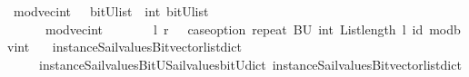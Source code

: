 \begin{isabellebody}
\isanewline
\isanewline
%
\isanewline
%
\isanewline
%
\isanewline
%
\isanewline
{}\isamarkupfalse%
\ mod{\isacharunderscore}vec{\isacharunderscore}int\ \ {\isacharcolon}{\isacharcolon}\ {\isachardoublequoteopen}{\isacharparenleft}bitU{\isacharparenright}list\ {\isasymRightarrow}\ int\ {\isasymRightarrow}{\isacharparenleft}bitU{\isacharparenright}list\ {\isachardoublequoteclose}\ \ \ \isanewline
\ \ \ \ \ {\isachardoublequoteopen}\ mod{\isacharunderscore}vec{\isacharunderscore}int\ \ \ \ \ \ \ \ l\ r\ {\isacharequal}\ {\isacharparenleft}\ case{\isacharunderscore}option\ {\isacharparenleft}repeat\ {\isacharbrackleft}BU{\isacharbrackright}\ {\isacharparenleft}int\ {\isacharparenleft}List{\isachardot}length\ l{\isacharparenright}{\isacharparenright}{\isacharparenright}\ id\ {\isacharparenleft}mod{\isacharunderscore}bv{\isacharunderscore}int\ \isanewline
\ \ {\isacharparenleft}instance{\isacharunderscore}Sail{}{\isacharunderscore}values{\isacharunderscore}Bitvector{\isacharunderscore}list{\isacharunderscore}dict\isanewline
\ \ \ \ \ instance{\isacharunderscore}Sail{}{\isacharunderscore}values{\isacharunderscore}BitU{\isacharunderscore}Sail{}{\isacharunderscore}values{\isacharunderscore}bitU{\isacharunderscore}dict{\isacharparenright}\ {\isacharparenleft}instance{\isacharunderscore}Sail{}{\isacharunderscore}values{\isacharunderscore}Bitvector{\isacharunderscore}list{\isacharunderscore}dict\isanewline

\end{isabellebody}
